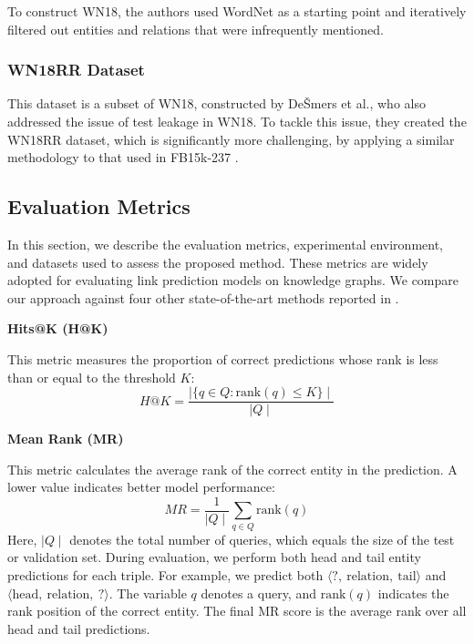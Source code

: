 To construct WN18, the authors used WordNet as a starting point and iteratively filtered out entities and relations that were infrequently mentioned.



\subsubsection{WN18RR Dataset}

This dataset is a subset of WN18, constructed by DeŠmers et al.\cite{dettmers2017convolutional}, who also addressed the issue of test leakage in WN18. To tackle this issue, they created the WN18RR dataset, which is significantly more challenging, by applying a similar methodology to that used in FB15k-237 \cite{toutanova2015observed}.

\subsection{Evaluation Metrics}

In this section, we describe the evaluation metrics, experimental environment, and datasets used to assess the proposed method. These metrics are widely adopted for evaluating link prediction models on knowledge graphs. We compare our approach against four other state-of-the-art methods reported in \cite{rossi2020knowledge}.

\textbf{Hits@K (H@K)}

This metric measures the proportion of correct predictions whose rank is less than or equal to the threshold \(K\):
\[
H@K = \frac{\mid \{ q \in Q : \text{rank}(q) \leq K \} \mid}{\mid Q \mid}
\]

\textbf{Mean Rank (MR)}

This metric calculates the average rank of the correct entity in the prediction. A lower value indicates better model performance:
\[
MR = \frac{1}{\mid Q \mid} \sum_{q \in Q} \text{rank}(q)
\]
Here, \(\mid Q \mid\) denotes the total number of queries, which equals the size of the test or validation set. During evaluation, we perform both head and tail entity predictions for each triple. For example, we predict both \(\langle ?,~ \text{relation},~ \text{tail} \rangle\) and \(\langle \text{head},~ \text{relation},~ ? \rangle\). The variable \(q\) denotes a query, and \(\text{rank}(q)\) indicates the rank position of the correct entity. The final MR score is the average rank over all head and tail predictions.

